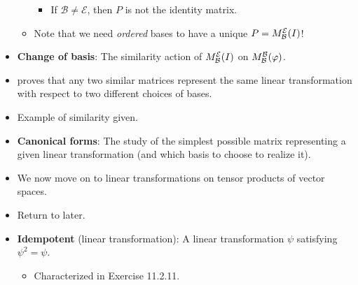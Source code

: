 \documentclass[../notes.tex]{subfiles}
\begin{document}
\begin{itemize}
\begin{itemize}
        \begin{itemize}
            \item If $\mathcal{B}\neq\mathcal{E}$, then $P$ is not the identity matrix.
        \end{itemize}
        \item Note that we need \emph{ordered} bases to have a unique $P=M_\mathcal{B}^\mathcal{E}(I)$!
    \end{itemize}
    \item \textbf{Change of basis}: The similarity action of $M_\mathcal{B}^\mathcal{E}(I)$ on $M_\mathcal{B}^\mathcal{B}(\varphi)$.
    \item \textcite{bib:DummitFoote} proves that any two similar matrices represent the same linear transformation with respect to two different choices of bases.
    \item Example of similarity given.
    \item \textbf{Canonical forms}: The study of the simplest possible matrix representing a given linear transformation (and which basis to choose to realize it).
    \item We now move on to linear transformations on tensor products of vector spaces.
    \item Return to later.
    \setcounter{proposition}{17}
    \item \textbf{Idempotent} (linear transformation): A linear transformation $\psi$ satisfying $\psi^2=\psi$.
    \begin{itemize}
        \item Characterized in Exercise 11.2.11.
    \end{itemize}
\end{itemize}
\end{document}
